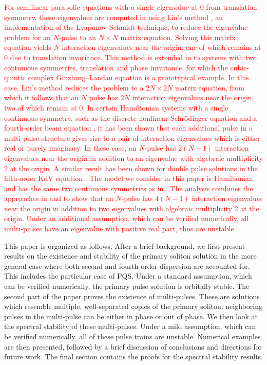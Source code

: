 \documentclass[12pt]{elsarticle}
\newcommand{\revised}[1]{ \textcolor{red}{#1} }
\begin{document}
\revised{For semilinear parabolic equations with a single eigenvalue at 0 from translation symmetry, these eigenvalues are computed in \cite{Sandstede1998} using Lin's method \cite{Lin1990}, an implementation of the Lyapunov-Schmidt technique, to reduce the eigenvalue problem for an $N$-pulse to an $N\times N$ matrix equation. Solving this matrix equation yields $N$ interaction eigenvalues near the origin, one of which remains at 0 due to translation invariance. This method is extended in \cite{Manukian} to systems with two continuous symmetries, translation and phase invariance, for which the cubic-quintic complex Ginzburg–Landau equation is a prototypical example. In this case, Lin's method reduces the problem to a $2N\times 2N$ matrix equation, from which it follows that an $N$ pulse has $2N$ interaction eigenvalues near the origin, two of which remain at 0. In certain Hamiltonian systems with a single continuous symmetry, such as the discrete nonlinear Schr{\"o}dinger equation \cite{Parker2020} and a fourth-order beam equation \cite{Kapitula2020}, it has been shown that each additional pulse in a multi-pulse structure gives rise to a pair of interaction eigenvalues which is either real or purely imaginary. In these case, an $N$-pulse has $2(N-1)$ interaction eigenvalues near the origin in addition to an eigenvalue with algebraic multiplicity 2 at the origin. A similar result has been shown for double pulse solutions in the fifth-order KdV equation \cite{Pelinovsky2007}. The model we consider in this paper is Hamiltonian and has the same two continuous symmetries as in \cite{Manukian}. The analysis combines the approaches in \cite{Manukian} and \cite{Parker2020} to show that an $N$-pulse has $4(N-1)$ interaction eigenvalues near the origin in addition to two eigenvalues with algebraic multiplicity 2 at the origin. Under an additional assumption, which can be verified numerically, all multi-pulses have an eigenvalue with positive real part, thus are unstable.}

This paper is organized as follows. After a brief background, we first present results on the existence and stability of the primary soliton solution in the more general case where both second and fourth order dispersion are accounted for. This includes the particular case of PQS. Under a standard assumption, which can be verified numerically, the primary pulse solution is orbitally stable. The second part of the paper proves the existence of multi-pulses. These are solutions which resemble multiple, well-separated copies of the primary soliton; neighboring pulses in the multi-pulse can be either in phase or out of phase. We then look at the spectral stability of these multi-pulses. Under a mild assumption, which can be verified numerically, all of these pulse trains are unstable. Numerical examples are then presented, followed by a brief discussion of conclusions and directions for future work. The final section contains the proofs for the spectral stability results.
\end{document}
